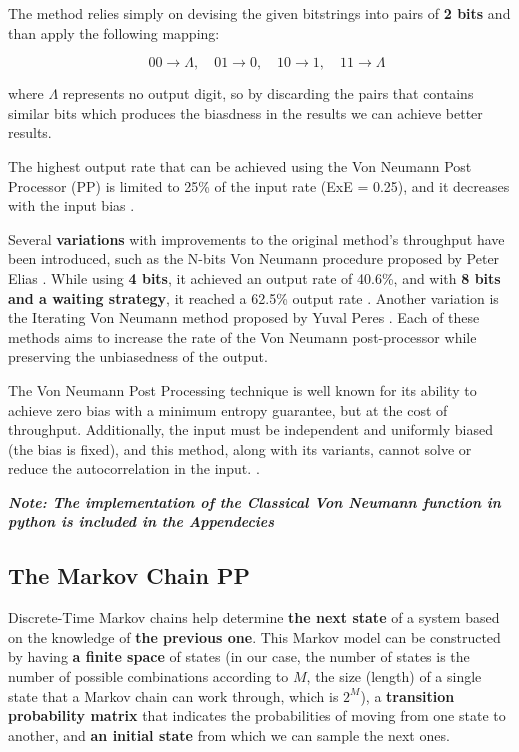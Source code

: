 The method relies simply on devising the given bitstrings into pairs of \textbf{2 bits} and than apply the following mapping:

\begin{equation}
    \quad 00 \rightarrow \Lambda , \quad 01 \rightarrow 0 , \quad 10 \rightarrow 1 , \quad 11 \rightarrow \Lambda
\end{equation}

where \( \Lambda \) represents no output digit, so by discarding the pairs that contains similar bits which produces the biasdness in the results we can achieve better results.

The highest output rate that can be achieved using the Von Neumann Post Processor (PP) is limited to 25\% of the input rate (ExE = 0.25), and it decreases with the input bias \cite{zonga}.

Several \textbf{variations} with improvements to the original method's throughput have been introduced, such as the N-bits Von Neumann procedure proposed by Peter Elias \cite{peter}. While using \textbf{4 bits}, it achieved an output rate of 40.6\%, and with \textbf{8 bits and a waiting strategy}, it reached a 62.5\% output rate \cite{zonga}. Another variation is the Iterating Von Neumann method proposed by Yuval Peres \cite{yuval}. Each of these methods aims to increase the rate of the Von Neumann post-processor while preserving the unbiasedness of the output.

The Von Neumann Post Processing technique is well known for its ability to achieve zero bias with a minimum entropy guarantee, but at the cost of throughput. Additionally, the input must be independent and uniformly biased (the bias is fixed), and this method, along with its variants, cannot solve or reduce the autocorrelation in the input. \cite{dede}.

\textbf{\textit{Note: The implementation of the Classical Von Neumann function in python is included in the Appendecies}}

\subsection{The Markov Chain PP}  
Discrete-Time Markov chains help determine \textbf{the next state} of a system based on the knowledge of \textbf{the previous one}. This Markov model can be constructed by having \textbf{a finite space} of states (in our case, the number of states is the number of possible combinations according to \( M \), the size (length) of a single state that a Markov chain can work through, which is \( 2^M \)), a \textbf{transition probability matrix} that indicates the probabilities of moving from one state to another, and \textbf{an initial state} from which we can sample the next ones.  

